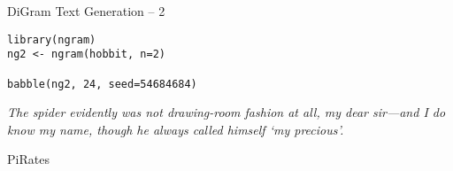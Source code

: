 \begin{frame}[fragile]{DiGram Text Generation -- 2}

\begin{verbatim}
library(ngram)
ng2 <- ngram(hobbit, n=2)

babble(ng2, 24, seed=54684684)
\end{verbatim}

\emph{The spider evidently was not drawing-room fashion at all, my dear
sir---and I do know my name, though he always called himself `my
precious'.}

\end{frame}

\begin{frame}{PiRates}


\end{frame}
